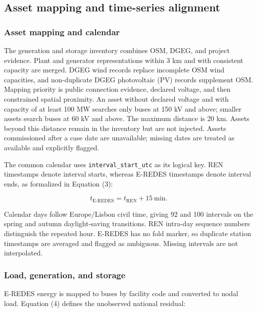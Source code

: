 \documentclass[
  10pt]{article}
\begin{document}
\subsection{Asset mapping and time-series
alignment}\label{asset-mapping-and-time-series-alignment}

\subsubsection{Asset mapping and
calendar}\label{asset-mapping-and-calendar}

The generation and storage inventory combines OSM, DGEG, and project
evidence. Plant and generator representations within 3 km and with
consistent capacity are merged. DGEG wind records replace incomplete OSM
wind capacities, and non-duplicate DGEG photovoltaic (PV) records
supplement OSM. Mapping priority is public connection evidence, declared
voltage, and then constrained spatial proximity. An asset without
declared voltage and with capacity of at least 100 MW searches only
buses at 150 kV and above; smaller assets search buses at 60 kV and
above. The maximum distance is 20 km. Assets beyond this distance remain
in the inventory but are not injected. Assets commissioned after a case
date are unavailable; missing dates are treated as available and
explicitly flagged.

The common calendar uses \texttt{interval\_start\_utc} as its logical
key. REN timestamps denote interval starts, whereas E-REDES timestamps
denote interval ends, as formalized in Equation (3):

\[
t_{\mathrm{E\text{-}REDES}}=t_{\mathrm{REN}}+15\ \mathrm{min}. \tag{3}\label{eq:time-alignment}
\]

Calendar days follow Europe/Lisbon civil time, giving 92 and 100
intervals on the spring and autumn daylight-saving transitions. REN
intra-day sequence numbers distinguish the repeated hour. E-REDES has no
fold marker, so duplicate station timestamps are averaged and flagged as
ambiguous. Missing intervals are not interpolated.

\subsubsection{Load, generation, and
storage}\label{load-generation-and-storage}

E-REDES energy is mapped to buses by facility code and converted to
nodal load. Equation (4) defines the unobserved national residual:
\end{document}
